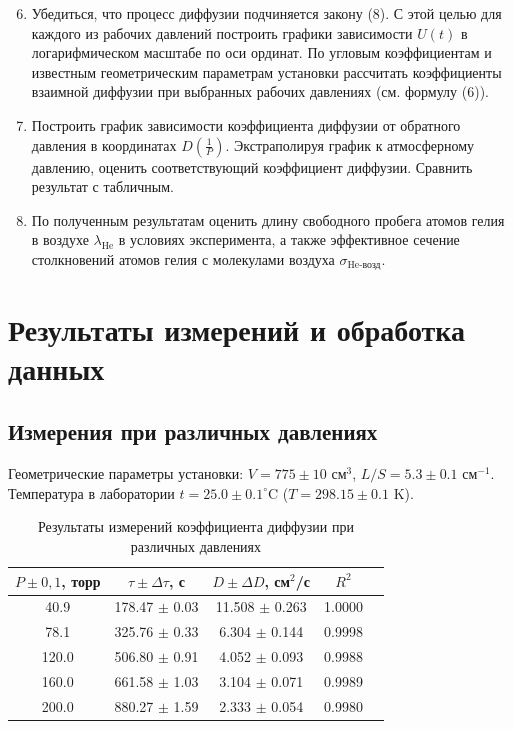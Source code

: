 \documentclass[a4paper]{article}
\begin{document}
	\begin{enumerate}
		\setcounter{enumi}{5}
		\item Убедиться, что процесс диффузии подчиняется закону (8). С этой целью для каждого из рабочих давлений построить графики зависимости $U(t)$ в логарифмическом масштабе по оси ординат. По угловым коэффициентам и известным геометрическим параметрам установки рассчитать коэффициенты взаимной диффузии при выбранных рабочих давлениях (см. формулу (6)).
		
		\item Построить график зависимости коэффициента диффузии от обратного давления в координатах $D\left(\frac{1}{P}\right)$. Экстраполируя график к атмосферному давлению, оценить соответствующий коэффициент диффузии. Сравнить результат с табличным.
	
		
		\item По полученным результатам оценить длину свободного пробега атомов гелия в воздухе $\lambda_{\text{He}}$ в условиях эксперимента, а также эффективное сечение столкновений атомов гелия с молекулами воздуха $\sigma_{\text{He-возд}}$.
		
	\end{enumerate}
	
	\section{Результаты измерений и обработка данных}
	
	\subsection{Измерения при различных давлениях}
	Геометрические параметры установки: \(V = 775\pm10\) см\(^3\), \(L/S = 5.3\pm0.1\) см\(^{-1}\). Температура в лаборатории \(t = 25.0\pm0.1^\circ\)C (\(T = 298.15\pm0.1\) K).

	\begin{table}[!h]
		\centering
		\caption{Результаты измерений коэффициента диффузии при различных давлениях}
		\begin{tabular}{|c|c|c|c|c|}
			\hline
			\(P \pm 0,1\), торр & \(\tau \pm \Delta\tau\), с & \(D \pm \Delta D\), см\(^2\)/с & \(R^2\) \\ \hline
			40.9 & 178.47 \(\pm\) 0.03 & 11.508 \(\pm\) 0.263 & 1.0000 \\
			78.1 & 325.76 \(\pm\) 0.33 & 6.304 \(\pm\) 0.144 & 0.9998 \\
			120.0 & 506.80 \(\pm\) 0.91 & 4.052 \(\pm\) 0.093 & 0.9988 \\
			160.0 & 661.58 \(\pm\) 1.03 & 3.104 \(\pm\) 0.071 & 0.9989 \\
			200.0 & 880.27 \(\pm\) 1.59 & 2.333 \(\pm\) 0.054 & 0.9980 \\ \hline
		\end{tabular}
	\end{table}
	
\end{document}

